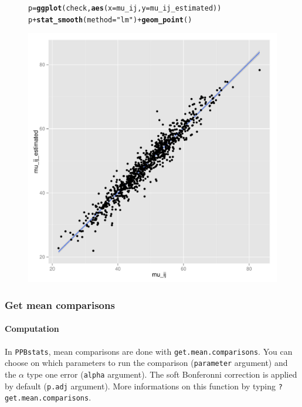 \documentclass{article}\usepackage[]{graphicx}\usepackage[]{color}
\makeatletter
\newcommand{\hlstr}[1]{\textcolor[rgb]{0.192,0.494,0.8}{#1}}%
\newcommand{\hlopt}[1]{\textcolor[rgb]{0,0,0}{#1}}%
\newcommand{\hlstd}[1]{\textcolor[rgb]{0.345,0.345,0.345}{#1}}%
\newcommand{\hlkwb}[1]{\textcolor[rgb]{0.69,0.353,0.396}{#1}}%
\newcommand{\hlkwc}[1]{\textcolor[rgb]{0.333,0.667,0.333}{#1}}%
\newcommand{\hlkwd}[1]{\textcolor[rgb]{0.737,0.353,0.396}{\textbf{#1}}}%
\newenvironment{kframe}{%
 \def\at@end@of@kframe{}%
 \ifinner\ifhmode%
  \def\at@end@of@kframe{\end{minipage}}%
  \begin{minipage}{\columnwidth}%
 \fi\fi%
 \def\FrameCommand##1{\hskip\@totalleftmargin \hskip-\fboxsep
 \colorbox{shadecolor}{##1}\hskip-\fboxsep
     \hskip-\linewidth \hskip-\@totalleftmargin \hskip\columnwidth}%
 \MakeFramed {\advance\hsize-\width
   \@totalleftmargin\z@ \linewidth\hsize
   \@setminipage}}%
 {\par\unskip\endMakeFramed%
 \at@end@of@kframe}
\newenvironment{knitrout}{}{} %
\newcommand{\pack}{\texttt{PPBstats}}
\makeatother
\begin{document}
\begin{figure}[H]
\begin{knitrout}
\color{fgcolor}\begin{kframe}
\begin{alltt}
\hlstd{p} \hlkwb{=} \hlkwd{ggplot}\hlstd{(check,} \hlkwd{aes}\hlstd{(}\hlkwc{x} \hlstd{= mu_ij,} \hlkwc{y} \hlstd{= mu_ij_estimated))}
\hlstd{p} \hlopt{+} \hlkwd{stat_smooth}\hlstd{(}\hlkwc{method} \hlstd{=} \hlstr{"lm"}\hlstd{)} \hlopt{+} \hlkwd{geom_point}\hlstd{()}
\end{alltt}
\end{kframe}

{\centering \includegraphics[width=.6\textwidth]{figures/PPBstats_unnamed-chunk-17-1} 

}



\end{knitrout}
\end{figure}


\subsubsection{Get mean comparisons}



\paragraph{Computation}

In \pack, mean comparisons are done with \texttt{get.mean.comparisons}.
You can choose on which parameters to run the comparison (\texttt{parameter} argument) and the $\alpha$ type one error (\texttt{alpha} argument).
The soft Bonferonni correction is applied by default (\texttt{p.adj} argument).
More informations on this function by typing \texttt{?get.mean.comparisons}.
\end{document}
